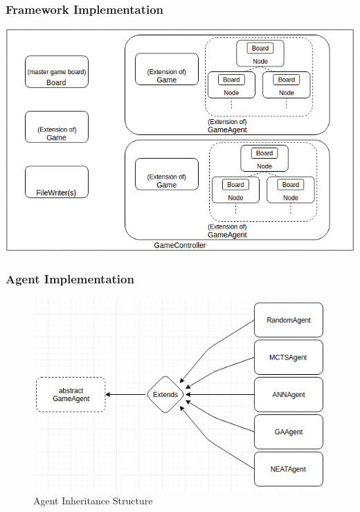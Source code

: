 \documentclass{beamer}
\begin{document}
\begin{frame}
\frametitle{Framework Implementation}
\vspace{-0.25in}
\begin{center}
\includegraphics[scale=.35]{images/finalframework.png}
\end{center}
\end{frame}

\begin{frame}
\frametitle{Agent Implementation}
\vspace{-0.25in}
\begin{figure}
\centering
\includegraphics[scale=.35]{images/gameagent.png}
\caption*{Agent Inheritance Structure}
\end{figure}

\end{frame}
\end{document}
